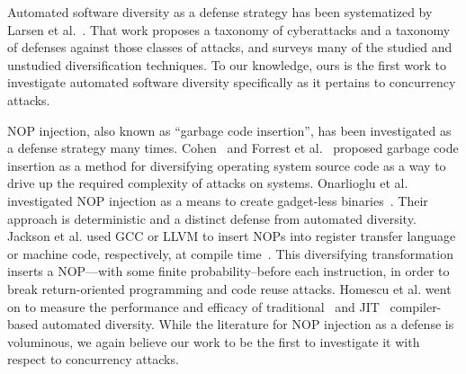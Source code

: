 Automated software diversity as a defense strategy has been systematized by Larsen et al.~\cite{Larsen2014}.
That work proposes a taxonomy of cyberattacks and a taxonomy of defenses against those classes of attacks, and surveys many of the studied and unstudied diversification techniques.
To our knowledge, ours is the first work to investigate automated software diversity specifically as it pertains to concurrency attacks.

NOP injection, also known as ``garbage code insertion'', has been investigated as a defense strategy many times.
Cohen~\cite{Cohen1993} and Forrest et al.~\cite{Forrest1997} proposed garbage code insertion as a method for diversifying operating system source code as a way to drive up the required complexity of attacks on systems.
Onarlioglu et al. investigated NOP injection as a means to create gadget-less binaries~\cite{Onarlioglu2010}.
Their approach is deterministic and a distinct defense from automated diversity.
Jackson et al. used GCC or LLVM to insert NOPs into register transfer language or machine code, respectively, at compile time~\cite{Jackson2013}.
This diversifying transformation inserts a NOP---with some finite probability--before each instruction, in order to break return-oriented programming and code reuse attacks.
Homescu et al. went on to measure the performance and efficacy of traditional~\cite{Homescu2013a} and JIT~\cite{Homescu2013} compiler-based automated diversity.
While the literature for NOP injection as a defense is voluminous, we again believe our work to be the first to investigate it with respect to concurrency attacks.